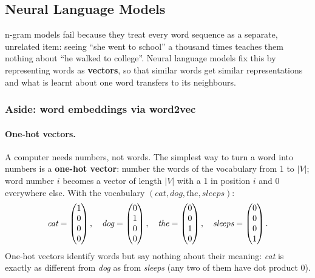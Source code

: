 \subsection{Neural Language Models}
\label{sec:neural-language-models}

n-gram models fail because they treat every word sequence as a separate, unrelated
item: seeing ``she went to school'' a thousand times teaches them nothing about ``he
walked to college''. Neural language models fix this by representing words as
\textbf{vectors}, so that similar words get similar representations and what is learnt
about one word transfers to its neighbours.

\subsubsection{Aside: word embeddings via word2vec}

\paragraph{One-hot vectors.}
\notinslides
A computer needs numbers, not words. The simplest way to turn a word into numbers is a
\textbf{one-hot vector}: number the words of the vocabulary from 1 to $|V|$; word number
$i$ becomes a vector of length $|V|$ with a 1 in position $i$ and 0 everywhere else.
With the vocabulary $(\textit{cat}, \textit{dog}, \textit{the}, \textit{sleeps})$:
\[
  \textit{cat} = \begin{pmatrix}1\\0\\0\\0\end{pmatrix}, \quad \textit{dog} = \begin{pmatrix}0\\1\\0\\0\end{pmatrix}, \quad
  \textit{the} = \begin{pmatrix}0\\0\\1\\0\end{pmatrix}, \quad \textit{sleeps} = \begin{pmatrix}0\\0\\0\\1\end{pmatrix}.
\]
One-hot vectors identify words but say nothing about their meaning: \emph{cat} is
exactly as different from \emph{dog} as from \emph{sleeps} (any two of them have
dot product 0).

